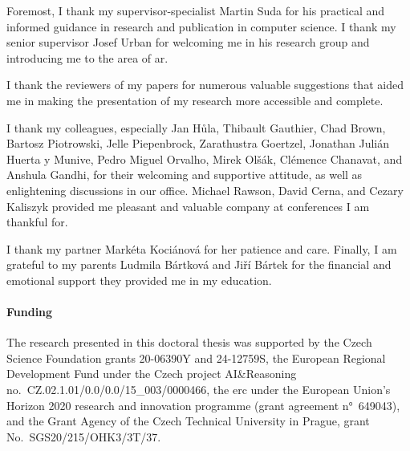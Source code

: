 \begin{thanks}
Foremost, I thank my supervisor-specialist Martin Suda for his practical and informed guidance in research and publication in computer science.
I thank my senior supervisor Josef Urban for welcoming me in his research group and introducing me to the area of \gls{ar}.

I thank the reviewers of my papers for numerous valuable suggestions that aided me in making the presentation of my research more accessible and complete.

I thank my colleagues, especially Jan Hůla, Thibault Gauthier, Chad Brown, Bartosz Piotrowski, Jelle Piepenbrock, Zarathustra Goertzel, Jonathan Julián Huerta y Munive, Pedro Miguel Orvalho, Mirek Olšák, Clémence Chanavat, and Anshula Gandhi, for their welcoming and supportive attitude, as well as enlightening discussions in our office.
Michael Rawson, David Cerna, and Cezary Kaliszyk provided me pleasant and valuable company at conferences I am thankful for.

I thank my partner Markéta Kociánová for her patience and care.
Finally, I am grateful to my parents Ludmila Bártková and Jiří Bártek for the financial and emotional support they provided me in my education.

\paragraph{Funding}



The research presented in this doctoral thesis was supported by
the Czech Science Foundation grants 20-06390Y and 24-12759S,
the European Regional Development Fund under the Czech project AI\&Reasoning no.~CZ.02.1.01/0.0/0.0/15\_003/0000466,
the \gls{erc} under the European Union's Horizon 2020 research and innovation programme (grant agreement n°~649043), and
the Grant Agency of the Czech Technical University in Prague, grant No.~SGS20/215/OHK3/3T/37.
\end{thanks}

